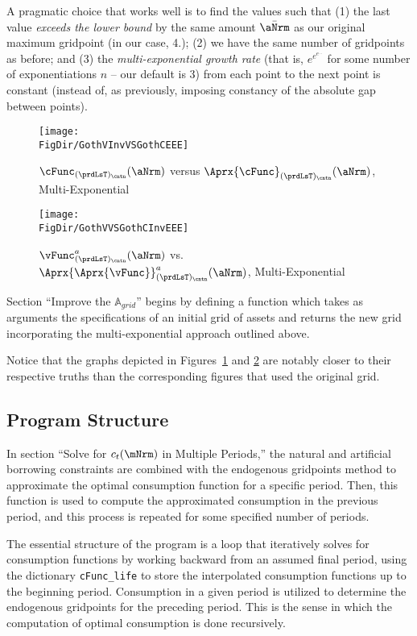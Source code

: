 \documentclass[\econtexRoot/SolvingMicroDSOPs]{subfiles}
\begin{document}
A pragmatic choice that works well is to find the values such that (1) the last value \textit{exceeds the lower bound} by the same amount $\bar\aNrm$ as our original maximum gridpoint (in our case, 4.); (2) we have the same number of gridpoints as before; and (3) the \textit{multi-exponential growth rate} (that is, $e^{e^{e^{...}}}$ for some number of exponentiations $n$ -- our default is 3) from each point to the next point is constant (instead of, as previously, imposing constancy of the absolute gap between points).

\hypertarget{GothVInvVSGothCEEE}{}
\begin{figure}
  \centerline{\texttt{[image: \\FigDir/GothVInvVSGothCEEE]}}
  \caption{$\cFunc_{(\prdLsT)_\cntn}(\aNrm)$ versus
    $\Aprx{\cFunc}_{(\prdLsT)_\cntn}(\aNrm)$, Multi-Exponential }
  \label{fig:GothVInvVSGothCEE}
\end{figure}


\hypertarget{GothVVSGothCInvEEE}{}
\begin{figure}
  \texttt{[image: \\FigDir/GothVVSGothCInvEEE]}
  \caption{$\vFunc^{a}_{(\prdLsT)_\cntn}(\aNrm)$ vs.
    $\Aprx{\Aprx{\vFunc}}_{(\prdLsT)_\cntn}^{a}(\aNrm)$, Multi-Exponential }
  \label{fig:GothVVSGothCInvEE}
\end{figure}

Section ``Improve the $\mathbb{A}_{grid}$'' begins by defining a function which takes as arguments the specifications of an initial grid of assets and returns the new grid incorporating the multi-exponential approach outlined above.


Notice that the graphs depicted in Figures~\ref{fig:GothVInvVSGothCEE} and \ref{fig:GothVVSGothCInvEE} are notably closer to their respective truths than the corresponding figures that used the original grid.

\subsection{Program Structure}

In section ``Solve for $c_t(\mNrm)$ in Multiple Periods,'' the natural and artificial borrowing constraints are combined with the endogenous gridpoints method to approximate the optimal consumption function for a specific period. Then, this function is used to compute the approximated consumption in the previous period, and this process is repeated for some specified number of periods.

The essential structure of the program is a loop that iteratively solves for consumption functions by working backward from an assumed final period, using the dictionary \texttt{cFunc\_life} to store the interpolated consumption functions up to the beginning period. Consumption in a given period is utilized to determine the endogenous gridpoints for the preceding period. This is the sense in which the computation of optimal consumption is done recursively.
\end{document}
